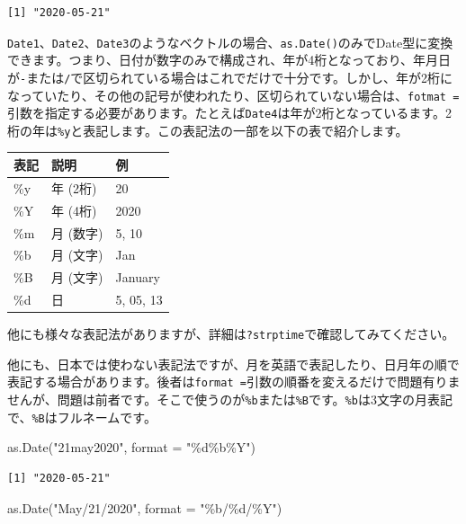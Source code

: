 \documentclass[
  a4paper,
  pandoc,
  ja=standard,
  jafont=haranoaji]{bxjsbook}
\newenvironment{Shaded}{\begin{snugshade}}{\end{snugshade}}
\newcommand{\AttributeTok}[1]{\textcolor[rgb]{0.00,0.48,0.65}{#1}}
\newcommand{\FunctionTok}[1]{\textcolor[rgb]{0.28,0.35,0.67}{#1}}
\newcommand{\NormalTok}[1]{\textcolor[rgb]{0.00,0.48,0.65}{#1}}
\newcommand{\StringTok}[1]{\textcolor[rgb]{0.13,0.47,0.30}{#1}}
\begin{document}
\begin{verbatim}
[1] "2020-05-21"
\end{verbatim}

\texttt{Date1}、\texttt{Date2}、\texttt{Date3}のようなベクトルの場合、\texttt{as.Date()}のみでDate型に変換できます。つまり、日付が数字のみで構成され、年が4桁となっており、年月日が\texttt{-}または\texttt{/}で区切られている場合はこれでだけで十分です。しかし、年が2桁になっていたり、その他の記号が使われたり、区切られていない場合は、\texttt{fotmat\ =}引数を指定する必要があります。たとえば\texttt{Date4}は年が2桁となっているます。2桁の年は\texttt{\%y}と表記します。この表記法の一部を以下の表で紹介します。

\begin{longtable}[]{@{}lll@{}}
\toprule
表記 & 説明 & 例 \\
\midrule
\endhead
\%y & 年 (2桁) & 20 \\
\%Y & 年 (4桁) & 2020 \\
\%m & 月 (数字) & 5, 10 \\
\%b & 月 (文字) & Jan \\
\%B & 月 (文字) & January \\
\%d & 日 & 5, 05, 13 \\
\bottomrule
\end{longtable}

他にも様々な表記法がありますが、詳細は\texttt{?strptime}で確認してみてください。

他にも、日本では使わない表記法ですが、月を英語で表記したり、日月年の順で表記する場合があります。後者は\texttt{format\ =}引数の順番を変えるだけで問題有りませんが、問題は前者です。そこで使うのが\texttt{\%b}または\texttt{\%B}です。\texttt{\%b}は3文字の月表記で、\texttt{\%B}はフルネームです。

\begin{Shaded}
\begin{Highlighting}[numbers=left,,]
\FunctionTok{as.Date}\NormalTok{(}\StringTok{"21may2020"}\NormalTok{,   }\AttributeTok{format =} \StringTok{"\%d\%b\%Y"}\NormalTok{)}
\end{Highlighting}
\end{Shaded}

\begin{verbatim}
[1] "2020-05-21"
\end{verbatim}

\begin{Shaded}
\begin{Highlighting}[numbers=left,,]
\FunctionTok{as.Date}\NormalTok{(}\StringTok{"May/21/2020"}\NormalTok{, }\AttributeTok{format =} \StringTok{"\%b/\%d/\%Y"}\NormalTok{)}
\end{Highlighting}
\end{Shaded}
\end{document}
